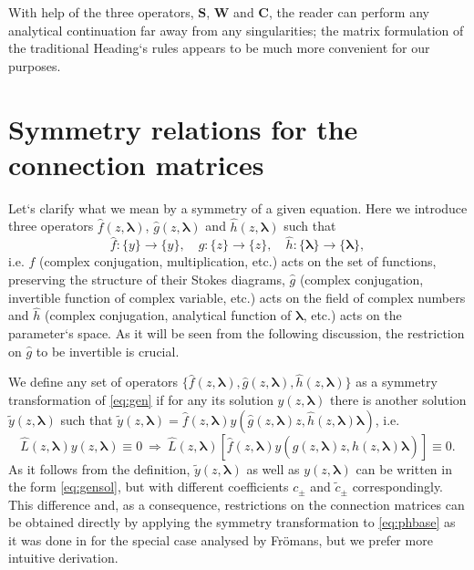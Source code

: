 \documentclass[atmp]{ipart_v1}
\def\LL{\widehat{L}}
\def\lmbd{\bm{\lambda}}
\def\f{\hat{f}}
\def\g{\hat{g}}
\def\h{\hat{h}}
\def\S{\bm{S}}
\def\W{\bm{W}}
\def\C{\bm{C}}
\newcommand\eref[1]{\eqref{#1}}
\begin{document}
With help of the three operators, $\S$, $\W$ and $\C$, the reader can perform any analytical continuation far
away from any singularities; the matrix formulation of the traditional Heading`s rules appears
to be much more convenient for our purposes.















\section{Symmetry relations for the connection matrices \label{sec:fmtrsymm}}

Let`s clarify what we mean by a symmetry of a given equation. Here we introduce three operators
$\f(z,\lmbd)$, $\g(z,\lmbd)$ and $\h(z,\lmbd)$ such that
\begin{equation}
\f:\{y\} \rightarrow \{y\}, \quad
\g:\{z\} \rightarrow \{z\}, \quad
\h:\{\lmbd\} \rightarrow \{\lmbd\},
\end{equation}
i.e. $\f$ (complex conjugation, multiplication, etc.) acts on the set of functions, preserving 
the structure of their Stokes diagrams, $\g$ (complex conjugation, invertible function of 
complex variable, etc.) acts on the field of complex numbers and $\h$ (complex conjugation, 
analytical function of $\lmbd$, etc.) acts on the parameter`s space. As it will be seen from the
following discussion, the restriction on $\g$ to be invertible is crucial. 

We define any set of operators $\{\f(z,\lmbd),\g(z,\lmbd),\h(z,\lmbd)\}$ as a symmetry 
transformation of \eref{eq:gen}
if for any its solution $y(z,\lmbd)$ there is another solution $\tilde{y}(z,\lmbd)$ such that
$\tilde{y}(z,\lmbd)=\f(z,\lmbd)y(\g(z,\lmbd)z,\h(z,\lmbd)\lmbd)$, i.e.
\begin{equation}
\LL(z,\lmbd)y(z,\lmbd) \equiv 0 \ \Longrightarrow\  
\LL(z,\lmbd) \left[ \f(z,\lmbd)y(\g(z,\lmbd)z,\h(z,\lmbd)\lmbd) \right] \equiv 0.   \label{eq:symdef}
\end{equation}
As it follows from the definition, 
$\tilde{y}(z,\lmbd)$ as well as $y(z,\lmbd)$ can be written in the form \eref{eq:gensol},
but with different coefficients $c_\pm$ and $\tilde{c}_\pm$ correspondingly. 
This difference and, as a consequence, restrictions on the connection matrices 
can be obtained directly by applying the symmetry transformation to \eref{eq:phbase} as it was 
done in \cite{frsymm} for the special case analysed by Fr\"omans, but we prefer more intuitive derivation.
\end{document}
